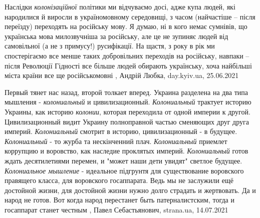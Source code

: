 Наслідки \emph{колонізаційної} політики ми відчуваємо досі, адже купа людей, які
народилися й виросли в україномовному середовищі, з часом (найчастіше – після
переїзду) переходять на російську мову. Я думаю, ні в кого немає сумнівів, що
українська мова милозвучніша за російську, але це не зупиняє людей від
самовільної (а не з примусу!) русифікації. На щастя, з року в рік ми
спостерігаємо все менше таких добровільних переходів на російську, навпаки –
після Революції Гідності все більше людей обирають українську, хоча найбільші
міста країни все ще російськомовні
, Андрій Любка, day.kyiv.ua, 25.06.2021

Первый тянет нас назад, второй толкает вперед.  Украина разделена на два типа
мышления - \emph{колониальный} и цивилизационный.  \emph{Колониальный} трактует историю
Украины, как историю \emph{колонии}, которая переходила от одной империи к другой.
Цивилизационный видит Украину полноправной частью сменяющих друг друга империй.
\emph{Колониальный} смотрит в историю, цивилизационный - в будущее.  \emph{Колониальный} - то
журба та нескінченний плач. \emph{Колониальный} приемлет коррупцию и воровство, как
наследие проклятых империй. \emph{Колониальный} готов ждать десятилетиями перемен, и
"может наши дети увидят" светлое будущее. \emph{Колониальное мышление} - идеальное
підгрунтя для существование воровского правящего класса, для воровского
госаппарата. Ведь мы не заслужили ещё достойной жизни, для достойной жизни
нужно долго страдать и жертвовать. Да и народ не готов. Вот когда народ
перестанет быть патерналистским, тогда и госаппарат станет честным
, 
Павел Себастьянович, strana.ua, 14.07.2021

